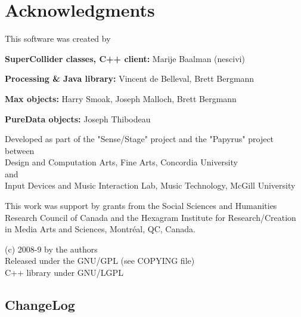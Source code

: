 \documentclass[letterpaper,10pt]{article}
\begin{document}
\section*{Acknowledgments}\label{sec:acknowledgments}
This software was created by

\textbf{SuperCollider classes, C++ client:}
Marije Baalman (nescivi)  

\textbf{Processing \& Java library:}
Vincent de Belleval,
Brett Bergmann

\textbf{Max objects:}
Harry Smoak,
Joseph Malloch, 
Brett Bergmann

\textbf{PureData objects:}
Joseph Thibodeau

Developed as part of the "Sense/Stage" project and the "Papyrus" project between\\
Design and Computation Arts, Fine Arts, Concordia University\\
and\\
Input Devices and Music Interaction Lab, Music Technology, McGill University

This work was support by grants from the Social Sciences and Humanities Research Council of Canada and the Hexagram Institute for Research/Creation in Media Arts and Sciences, Montr\'eal, QC, Canada.

\vspace*{0.5cm}
(c) 2008-9 by the authors\\
Released under the GNU/GPL (see COPYING file)\\
C++ library under GNU/LGPL

\subsection*{ChangeLog}
\end{document}
